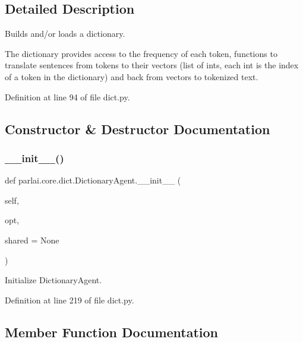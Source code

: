 \subsection{Detailed Description}
\begin{DoxyVerb}Builds and/or loads a dictionary.

The dictionary provides access to the frequency of each token, functions
to translate sentences from tokens to their vectors (list of ints, each
int is the index of a token in the dictionary) and back from vectors to
tokenized text.
\end{DoxyVerb}
 

Definition at line 94 of file dict.\+py.



\subsection{Constructor \& Destructor Documentation}
\mbox{\label{classparlai_1_1core_1_1dict_1_1DictionaryAgent_a324531500b43e0039f2c0087081a8b3d}} 
\subsubsection{\texorpdfstring{\+\_\+\+\_\+init\+\_\+\+\_\+()}{\_\_init\_\_()}}
{\footnotesize\ttfamily def parlai.\+core.\+dict.\+Dictionary\+Agent.\+\_\+\+\_\+init\+\_\+\+\_\+ (\begin{DoxyParamCaption}\item[{}]{self,  }\item[{}]{opt,  }\item[{}]{shared = {\ttfamily None} }\end{DoxyParamCaption})}

\begin{DoxyVerb}Initialize DictionaryAgent.\end{DoxyVerb}
 

Definition at line 219 of file dict.\+py.



\subsection{Member Function Documentation}
\mbox{\label{classparlai_1_1core_1_1dict_1_1DictionaryAgent_a29f4181dcdd5f53103bc342bf5f3c74a}} 
